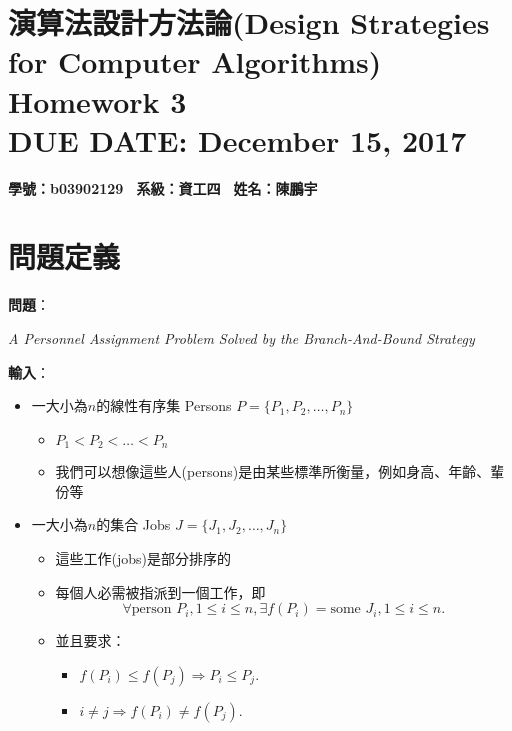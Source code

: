 \documentclass[15pt]{extarticle}
\newcommand{\hmwkClass}{演算法設計方法論(Design Strategies for Computer Algorithms)}
\newcommand{\hmwkTitle}{Homework 3}
\newcommand{\hmwkDueDate}{December 15, 2017}
\begin{document}
\thispagestyle{empty}
\section*{\hmwkClass \\
    \normalsize{\hmwkTitle} \\
    \normalsize{DUE DATE: \hmwkDueDate}
}

\hfill \textbf{學號：b03902129 \, 系級：資工四 \, 姓名：陳鵬宇} \\

\section{問題定義}
\textbf{問題}：\begin{minipage}[t]{0.8\linewidth}
    \textit{A Personnel Assignment Problem Solved by the Branch-And-Bound Strategy} \vskip0mm
\end{minipage}

\vskip3mm
\textbf{輸入}：
\begin{minipage}[t]{0.8\linewidth}
    \begin{itemize}
        \item 一大小為$n$的線性有序集 Persons $P=\{P_1, P_2, \dots, P_n\}$
        \begin{itemize}
            \item $P_1 < P_2 < \dots < P_n$
            \item 我們可以想像這些人(persons)是由某些標準所衡量，例如身高、年齡、輩份等 
    \end{itemize}
        \item 一大小為$n$的集合 Jobs $J=\{J_1,J_2,\dots,J_n\}$
        \begin{itemize}
            \item 這些工作(jobs)是部分排序的
            \item 每個人必需被指派到一個工作，即$$\forall\mbox{person } P_i, 1\le i\le n,\exists f(P_i)=\mbox{some }J_i, 1\le i\le n.$$
            \item 並且要求：
            \begin{itemize}
                \item $f(P_i)\le f(P_j)\Rightarrow P_i\le P_j.$
                \item $i\ne j\Rightarrow f(P_i)\ne f(P_j).$
            \end{itemize}
        \end{itemize}
    \end{itemize}
\end{minipage}
\end{document}

